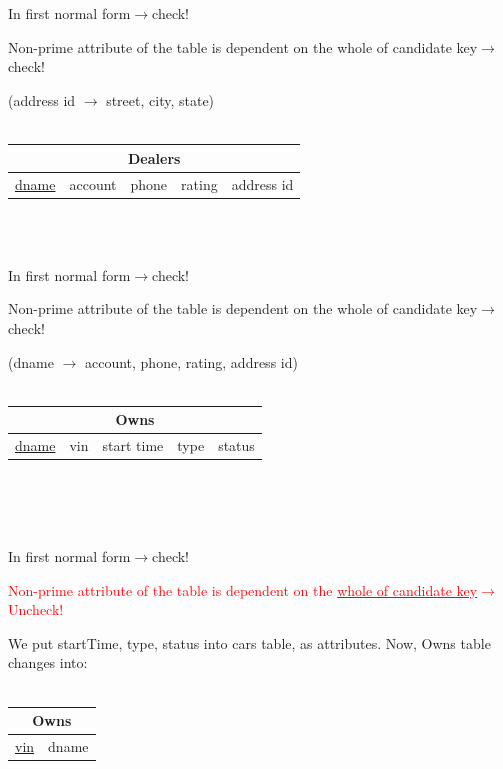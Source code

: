 \documentclass[12pt]{article}
\begin{document}
~\\~\\
\par In first normal form\hfill$\rightarrow$check!
\par Non-prime attribute of the table is dependent on the whole of candidate key\hfill$\rightarrow$check!
\par (address id $\rightarrow$ street, city, state)\\
~\\
\begin{tabularx}{\textwidth}{|X|X|X|X|X|}
\hline
\multicolumn{5}{|c|}{Dealers}\\\hline
\underline{dname} & account & phone & rating & \cellcolor{green!25}address id\\\hline
\end{tabularx}
~\\~\\
\par In first normal form\hfill$\rightarrow$check!
\par Non-prime attribute of the table is dependent on the whole of candidate key\hfill$\rightarrow$check!
\par (dname $\rightarrow$ account, phone, rating, address id)\\
~\\
\begin{tabularx}{\textwidth}{|X|X|X|X|X|}
\hline
\multicolumn{5}{|c|}{Owns}\\\hline
\underline{dname} & vin & start time & type & status\\\hline
\end{tabularx}
~\\~\\~\\
\par In first normal form\hfill$\rightarrow$check!
\par \textcolor{red}{Non-prime attribute of the table is dependent on the \underline{whole of candidate key}\hfill$\rightarrow$Uncheck!}
\par We put startTime, type, status into cars table, as attributes. Now, Owns table changes into:\\
~\\
\begin{tabularx}{\textwidth}{|X|X|}
\hline
\multicolumn{2}{|c|}{Owns}\\\hline
\underline{vin} & dname\\\hline
\end{tabularx}
~\\~\\
\end{document}
